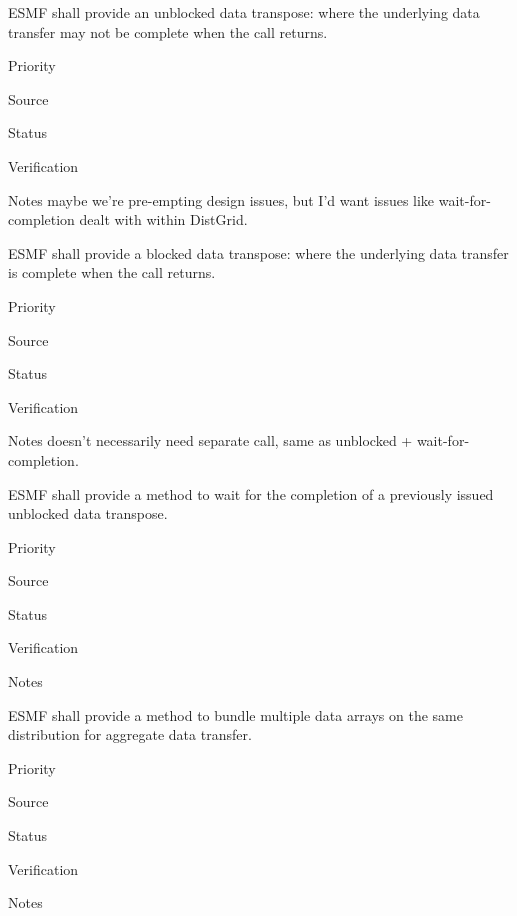 

ESMF shall provide an unblocked data transpose: where the underlying
data transfer may not be complete when the call returns.

\begin{reqlist}
\item[Priority]
\item[Source]
\item[Status]
\item[Verification]
\item[Notes] maybe we're pre-empting design issues, but I'd want
  issues like wait-for-completion dealt with within DistGrid.
\end{reqlist}


ESMF shall provide a blocked data transpose: where the underlying
data transfer is complete when the call returns.

\begin{reqlist}
\item[Priority]
\item[Source]
\item[Status]
\item[Verification]
\item[Notes] doesn't necessarily need separate call, same as unblocked
  + wait-for-completion.
\end{reqlist}


ESMF shall provide a method to wait for the completion of a previously
issued unblocked data transpose.

\begin{reqlist}
\item[Priority]
\item[Source]
\item[Status]
\item[Verification]
\item[Notes]
\end{reqlist}


ESMF shall provide a method to bundle multiple data arrays on the same
distribution for aggregate data transfer.

\begin{reqlist}
\item[Priority]
\item[Source]
\item[Status]
\item[Verification]
\item[Notes]
\end{reqlist}

